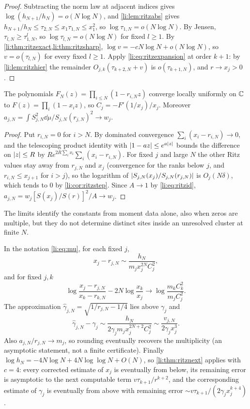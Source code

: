 \begin{proof}
Subtracting the norm law at adjacent indices gives $\log(h_{N+1}/h_N)=o(N\log N)$, and
\cref{li:lem:ritzabs} gives $h_{N+1}/h_N\le\tau_{2,N}\le x_1\tau_{1,N}\le x_1^2$, so
$\log\tau_{1,N}=o(N\log N)$. By Jensen, $\tau_{l,N}\ge\tau_{1,N}^l$, so $\log\tau_{l,N}=o(N\log N)$ for
fixed $l\ge1$. By \cref{li:thm:ritzexact,li:thm:ritzsharp}, $\log v=-cN\log N+o(N\log N)$, so
$v=o(\tau_{l,N})$ for every fixed $l\ge1$. Apply \eqref{li:eq:ritzexpansion} at order $k+1$: by
\cref{li:lem:ritzhier} the remainder $O_{j,k}(\tau_{k+2,N}+v)$ is $o(\tau_{k+1,N})$, and $r\to x_j>0$.
\end{proof}

\begin{proposition}\label{li:prop:ritzprod}
The polynomials $F_N(z)=\prod_{i\le N}(1-r_{i,N}z)$ converge locally uniformly on $\mathbb{C}$ to
$F(z)=\prod_i(1-x_iz)$, so $C_j=-F'(1/x_j)/x_j$. Moreover
$a_{j,N}=\int S_{j,N}^2\dd\mu/S_{j,N}(r_{j,N})^2\to w_j$.
\end{proposition}

\begin{proof}
Put $r_{i,N}=0$ for $i>N$. By dominated convergence $\sum_i(x_i-r_{i,N})\to0$, and the telescoping
product identity with $\lvert1-az\rvert\le e^{a\lvert z\rvert}$ bounds the difference on $\lvert z\rvert\le R$ by
$Re^{2R\sum_ix_i}\sum_i(x_i-r_{i,N})$. For fixed $j$ and large $N$ the other Ritz values stay away from
$r_{j,N}$ and $x_j$ (convergence for the ranks below $j$, and $r_{i,N}\le x_{j+1}$ for $i>j$), so the
logarithm of $\lvert S_{j,N}(x_j)/S_{j,N}(r_{j,N})\rvert$ is $O_j(N\delta)$, which tends to $0$ by
\cref{li:cor:ritzstep}. Since $A\to1$ by \eqref{li:eq:ritzid},
$a_{j,N}=w_j[S(x_j)/S(r)]^2/A\to w_j$.
\end{proof}

The limits identify the constants from moment data alone, also when zeros are multiple, but they do
not determine distinct sites inside an unresolved cluster at finite $N$.

\begin{corollary}\label{li:cor:ritzzeta}
In the notation \eqref{li:eq:mu}, for each fixed $j$,
\begin{equation}\label{li:eq:ritzzeta}
 x_j-r_{j,N}\sim\frac{h_N}{m_jx_j^{2N}C_j^2},
\end{equation}
and for fixed $j,k$
\[
 \log\frac{x_j-r_{j,N}}{x_k-r_{k,N}}-2N\log\frac{x_k}{x_j}\longrightarrow\log\frac{m_kC_k^2}{m_jC_j^2}.
\]
The approximation $\widehat\gamma_{j,N}=\sqrt{1/r_{j,N}-1/4}$ lies above $\gamma_j$ and
\[
 \widehat\gamma_{j,N}-\gamma_j\sim\frac{h_N}{2\gamma_jm_jx_j^{2N+2}C_j^2}\sim\frac{v_{j,N}}{2\gamma_jx_j^3}.
\]
Also $a_{j,N}/r_{j,N}\to m_j$, so rounding eventually recovers the multiplicity (an asymptotic statement,
not a finite certificate). Finally $\log h_N=-4N\log N+4N\log\log N+O(N)$, so \cref{li:thm:ritznext}
applies with $c=4$: every corrected estimate of $x_j$ is eventually from below, its remaining error is
asymptotic to the next computable term $v\tau_{k+1}/r^{k+2}$, and the corresponding estimate of
$\gamma_j$ is eventually from above with remaining error $\sim v\tau_{k+1}/(2\gamma_jx_j^{k+4})$.
\end{corollary}

